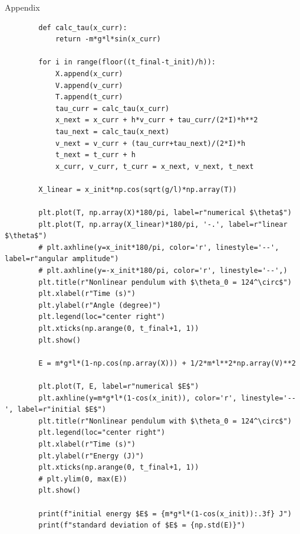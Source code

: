 \documentclass{article}
\begin{document}
\begin{section*}{Appendix}
\begin{enumerate}[1.]
\begin{verbatim}
		def calc_tau(x_curr):
			return -m*g*l*sin(x_curr)
		
		for i in range(floor((t_final-t_init)/h)):
			X.append(x_curr)
			V.append(v_curr)
			T.append(t_curr)
			tau_curr = calc_tau(x_curr)
			x_next = x_curr + h*v_curr + tau_curr/(2*I)*h**2
			tau_next = calc_tau(x_next)
			v_next = v_curr + (tau_curr+tau_next)/(2*I)*h
			t_next = t_curr + h
			x_curr, v_curr, t_curr = x_next, v_next, t_next
		
		X_linear = x_init*np.cos(sqrt(g/l)*np.array(T))
		
		plt.plot(T, np.array(X)*180/pi, label=r"numerical $\theta$")
		plt.plot(T, np.array(X_linear)*180/pi, '-.', label=r"linear $\theta$")
		# plt.axhline(y=x_init*180/pi, color='r', linestyle='--', label=r"angular amplitude")
		# plt.axhline(y=-x_init*180/pi, color='r', linestyle='--',)
		plt.title(r"Nonlinear pendulum with $\theta_0 = 124^\circ$")
		plt.xlabel(r"Time (s)")
		plt.ylabel(r"Angle (degree)")
		plt.legend(loc="center right")
		plt.xticks(np.arange(0, t_final+1, 1))
		plt.show()
		
		E = m*g*l*(1-np.cos(np.array(X))) + 1/2*m*l**2*np.array(V)**2
		
		plt.plot(T, E, label=r"numerical $E$")
		plt.axhline(y=m*g*l*(1-cos(x_init)), color='r', linestyle='--', label=r"initial $E$")
		plt.title(r"Nonlinear pendulum with $\theta_0 = 124^\circ$")
		plt.legend(loc="center right")
		plt.xlabel(r"Time (s)")
		plt.ylabel(r"Energy (J)")
		plt.xticks(np.arange(0, t_final+1, 1))
		# plt.ylim(0, max(E))
		plt.show()
		
		print(f"initial energy $E$ = {m*g*l*(1-cos(x_init)):.3f} J")
		print(f"standard deviation of $E$ = {np.std(E)}")
		\end{verbatim}

	\end{enumerate}
\end{section*}
\end{document}
